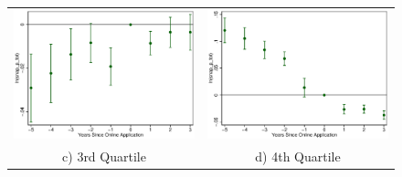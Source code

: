 \documentclass[11pt,letterpaper]{article}
\begin{document}
\begin{figure}
\begin{tabular}{cc}
\includegraphics[scale=0.57]{tabfig/evstu_size3_snap_p_tot_one_yrcfcttr_5_3}&\includegraphics[scale=0.57]{tabfig/evstu_size4_snap_p_tot_one_yrcfcttr_5_3}\\
c) 3rd Quartile & d) 4th Quartile\\
\end{tabular}
\end{figure}
\end{document}
